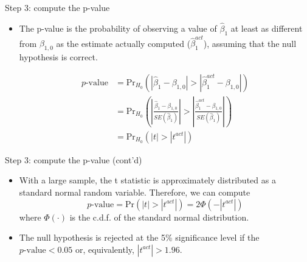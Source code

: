 \documentclass[presentation]{beamer}
\begin{document}
\begin{frame}[label={sec:orge884190}]{Step 3: compute the p-value}
\begin{itemize}
\item The p-value is the probability of observing a value of \(\hat{\beta}_1\)
at least as different from \(\beta_{1,0}\) as the estimate actually
computed (\(\hat{\beta}^{act}_1\)), assuming that the null hypothesis is
correct. 

\begin{equation*}
\begin{split}
p\text{-value} &= \mathrm{Pr}_{H_0} \left( | \hat{\beta}_1 - \beta_{1,0} | > | \hat{\beta}^{act}_1 - \beta_{1,0} | \right) \\
&= \mathrm{Pr}_{H_0} \left( \left| \frac{\hat{\beta}_1 - \beta_{1,0}}{SE(\hat{\beta}_1)} \right| > \left| \frac{\hat{\beta}^{act}_1 - \beta_{1,0}}{SE(\hat{\beta}_1)} \right| \right) \\
&= \mathrm{Pr}_{H_0} \left( |t| > |t^{act}| \right)
\end{split}
\end{equation*}
\end{itemize}
\end{frame}

\begin{frame}[label={sec:org01dd82b}]{Step 3: compute the p-value (cont'd)}
\begin{itemize}
\item With a large sample, the t statistic is approximately distributed as
a standard normal random variable. Therefore, we can compute 
\[p\text{-value} = \mathrm{Pr}\left(|t| > |t^{act}|
  \right) = 2 \Phi(-|t^{act}|)\]
where \(\Phi(\cdot)\) is the c.d.f. of the standard normal
distribution.

\item The null hypothesis is rejected at the 5\% significance level if the
\(p\text{-value} < 0.05\) or, equivalently, \(|t^{act}| > 1.96\).
\end{itemize}
\end{frame}
\end{document}
